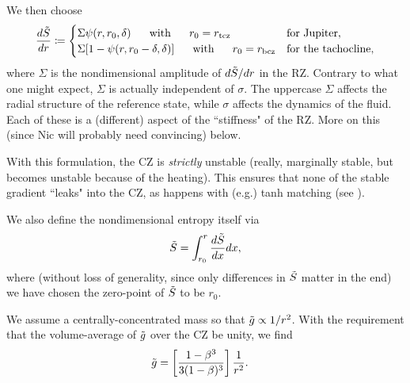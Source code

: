 \documentclass[12pt]{article}
\numberwithin{equation}{section}
\begin{document}
We then choose 
\begin{align}
	\frac{d\tilde{S}}{dr}\coloneqq \begin{cases}
		\Sigma\psi(r,r_0,\delta)\ \ \ \ \ \text{with}\ \ \ \ \  r_0=r_{\rm tcz}&\text{for Jupiter},\\
		\Sigma[1-\psi(r,r_0-\delta,\delta)]\ \ \ \ \ \text{with}\ \ \ \ \  r_0=r_{\rm bcz} &\text{for the tachocline},
	\end{cases}
\end{align}
where $\Sigma$ is the nondimensional amplitude of $d\tilde{S}/dr$ in the RZ. Contrary to what one might expect, $\Sigma$ is actually independent of $\sigma$. The uppercase $\Sigma$ affects the radial structure of the reference state, while $\sigma$ affects the dynamics of the fluid. Each of these is a (different) aspect of the ``stiffness" of the RZ. More on this (since Nic will probably need convincing) below. 

With this formulation, the CZ is \textit{strictly} unstable (really, marginally stable, but becomes unstable because of the heating). This ensures that none of the stable gradient ``leaks" into the CZ, as happens with (e.g.) tanh matching (see \citealt{Matilsky2024}). 

We also define the nondimensional entropy itself via
\begin{align}
	\tilde{S} = \int_{r_0}^r \frac{d\tilde{S}}{dx}dx,
\end{align}
where (without loss of generality, since only differences in $\tilde{S}$ matter in the end) we have chosen the zero-point of $\tilde{S}$ to be $r_0$. 

We assume a centrally-concentrated mass so that $\tilde{g}\propto 1/r^2$. With the requirement that the volume-average of $\tilde{g}$ over the CZ be unity, we find
\begin{align}
	\tilde{g} &= \left[ \frac{1-\beta^3}{3(1-\beta)^3}    \right]\frac{1}{r^2}.
\end{align}
\end{document}

